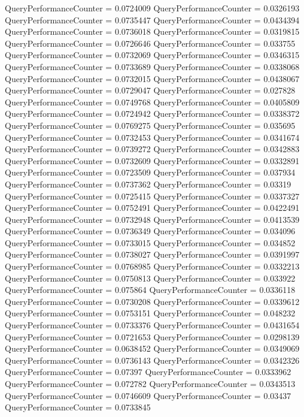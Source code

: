 \documentclass[9pt]{article}
\theoremstyle{plain}
\theoremstyle{definition}
\theoremstyle{remark}
\numberwithin{equation}{section}
\begin{document}
QueryPerformanceCounter  =  0.0724009
QueryPerformanceCounter  =  0.0326193
QueryPerformanceCounter  =  0.0735447
QueryPerformanceCounter  =  0.0434394
QueryPerformanceCounter  =  0.0736018
QueryPerformanceCounter  =  0.0319815
QueryPerformanceCounter  =  0.0726646
QueryPerformanceCounter  =  0.033755
QueryPerformanceCounter  =  0.0732069
QueryPerformanceCounter  =  0.0346315
QueryPerformanceCounter  =  0.0733689
QueryPerformanceCounter  =  0.0338068
QueryPerformanceCounter  =  0.0732015
QueryPerformanceCounter  =  0.0438067
QueryPerformanceCounter  =  0.0729047
QueryPerformanceCounter  =  0.027828
QueryPerformanceCounter  =  0.0749768
QueryPerformanceCounter  =  0.0405809
QueryPerformanceCounter  =  0.0724942
QueryPerformanceCounter  =  0.0338372
QueryPerformanceCounter  =  0.0769275
QueryPerformanceCounter  =  0.035695
QueryPerformanceCounter  =  0.0732453
QueryPerformanceCounter  =  0.0341674
QueryPerformanceCounter  =  0.0739272
QueryPerformanceCounter  =  0.0342883
QueryPerformanceCounter  =  0.0732609
QueryPerformanceCounter  =  0.0332891
QueryPerformanceCounter  =  0.0723509
QueryPerformanceCounter  =  0.037934
QueryPerformanceCounter  =  0.0737362
QueryPerformanceCounter  =  0.03319
QueryPerformanceCounter  =  0.0725415
QueryPerformanceCounter  =  0.0337327
QueryPerformanceCounter  =  0.0752491
QueryPerformanceCounter  =  0.0422491
QueryPerformanceCounter  =  0.0732948
QueryPerformanceCounter  =  0.0413539
QueryPerformanceCounter  =  0.0736349
QueryPerformanceCounter  =  0.034096
QueryPerformanceCounter  =  0.0733015
QueryPerformanceCounter  =  0.034852
QueryPerformanceCounter  =  0.0738027
QueryPerformanceCounter  =  0.0391997
QueryPerformanceCounter  =  0.0768985
QueryPerformanceCounter  =  0.0332213
QueryPerformanceCounter  =  0.0750813
QueryPerformanceCounter  =  0.033922
QueryPerformanceCounter  =  0.075864
QueryPerformanceCounter  =  0.0336118
QueryPerformanceCounter  =  0.0730208
QueryPerformanceCounter  =  0.0339612
QueryPerformanceCounter  =  0.0753151
QueryPerformanceCounter  =  0.048232
QueryPerformanceCounter  =  0.0733376
QueryPerformanceCounter  =  0.0431654
QueryPerformanceCounter  =  0.0721653
QueryPerformanceCounter  =  0.0298139
QueryPerformanceCounter  =  0.0638452
QueryPerformanceCounter  =  0.0349069
QueryPerformanceCounter  =  0.0736143
QueryPerformanceCounter  =  0.0342326
QueryPerformanceCounter  =  0.07397
QueryPerformanceCounter  =  0.0333962
QueryPerformanceCounter  =  0.072782
QueryPerformanceCounter  =  0.0343513
QueryPerformanceCounter  =  0.0746609
QueryPerformanceCounter  =  0.03437
QueryPerformanceCounter  =  0.0733845
\end{document}
